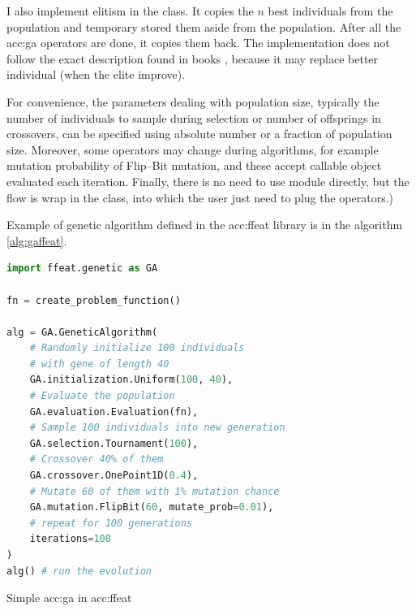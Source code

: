 I also implement elitism in the  class. It copies the $n$ best individuals from the population and temporary stored them aside from the population. After all the \acrshort{acc:ga} operators are done, it copies them back. The implementation does not follow the exact description found in books \citep{IntroductionToEA}, because it may replace better individual (when the elite improve).

For convenience, the parameters dealing with population size, typically the number of individuals to sample during selection or number of offsprings in crossovers, can be specified using absolute number or a fraction of population size. Moreover, some operators may change during algorithms, for example mutation probability of Flip--Bit mutation, and these accept callable object evaluated each iteration. Finally, there is no need to use  module directly, but the flow is wrap in the  class, into which the user just need to plug the operators.)

Example of genetic algorithm defined in the \acrshort{acc:ffeat} library is in the algorithm \ref{alg:gaffeat}.

\begin{algorithm}[hb!]
\begin{lstlisting}[language=Python, xrightmargin=18pt]
import ffeat.genetic as GA

fn = create_problem_function()

alg = GA.GeneticAlgorithm(
    # Randomly initialize 100 individuals 
    # with gene of length 40
    GA.initialization.Uniform(100, 40),
    # Evaluate the population
    GA.evaluation.Evaluation(fn),
    # Sample 100 individuals into new generation
    GA.selection.Tournament(100),
    # Crossover 40% of them
    GA.crossover.OnePoint1D(0.4),
    # Mutate 60 of them with 1% mutation chance
    GA.mutation.FlipBit(60, mutate_prob=0.01),
    # repeat for 100 generations
    iterations=100
)
alg() # run the evolution
\end{lstlisting}
\caption{Simple \acrshort*{acc:ga} in \acrshort*{acc:ffeat}}
\label{alg:gaffeat}
\end{algorithm}




